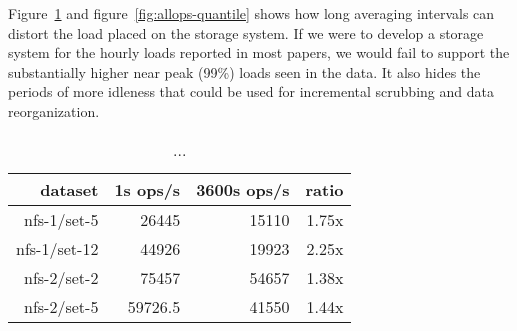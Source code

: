Figure~\ref{table:99quant-differences} and
figure~\ref{fig:allops-quantile} shows how long averaging intervals
can distort the load placed on the storage system.  If we were to
develop a storage system for the hourly loads reported in most papers,
we would fail to support the substantially higher near peak (99\%)
loads seen in the data.  It also hides the periods of more idleness
that could be used for incremental scrubbing and data reorganization.

\begin{table}
\begin{tabular}{|r|r|r|r|}
\hline
dataset & 1s ops/s & 3600s ops/s & ratio \\
\hline
nfs-1/set-5  & 26445  & 15110 & 1.75x \\
nfs-1/set-12 & 44926 & 19923 & 2.25x \\
nfs-2/set-2  & 75457 & 54657 & 1.38x \\
nfs-2/set-5  & 59726.5 & 41550 & 1.44x \\
\hline
\end{tabular}
\caption{...}
\label{table:99quant-differences}
\end{table}

